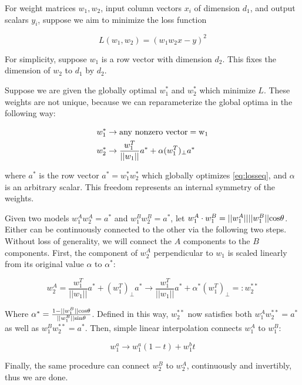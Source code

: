 \documentclass[twocolumn,superscriptaddress,aps,prb,floatfix]{revtex4-1}
\begin{document}
 For weight matrices $w_1, w_2$, input column vectors $x_i$ of dimension $d_1$, and output scalars $y_i$, suppose we aim to minimize the loss function
 
  \begin{equation}
 L(w_1,w_2)=(w_1 w_2 x - y)^2 \label{eq:losseq}
  \end{equation}
 
 For simplicity, suppose $w_1$ is a row vector with dimension $d_2$.  This fixes the dimension of $w_2$ to $d_1$ by $d_2$.
 
 Suppose we are given the globally optimal $w_1^*$ and $w_2^*$ which minimize $L$.  These weights are not unique, because we can reparameterize the global optima in the following way:
 
  \begin{align}
 w_1^* &\rightarrow \rm{any\ nonzero\ vector} = w_1 \\
 w_2^* &\rightarrow \frac{w_1^T}{||w_1||} a^* + \alpha (w_1^T)_\perp a^*
  \end{align}
  
  where $a^*$ is the row vector $a^*=w_1^* w_2^*$ which globally optimizes \eqref{eq:losseq}, and $\alpha$ is an arbitrary scalar.  This freedom represents an internal symmetry of the weights.
  
  Given two models $w_1^A w_2^A = a^*$ and $w_1^B w_2^B = a^*$, let $w_1^A \cdot w_1^B=||w_1^A||||w_1^B||\rm{cos}\theta$.  Either can be continuously connected to the other via the following two steps.  Without loss of generality, we will connect the $A$ components to the $B$ components.  First, the component of $w_2^A$ perpendicular to $w_1$ is scaled linearly from its original value $\alpha$ to $\alpha^*$:
  
 \begin{equation}
 w_2^A = \frac{w_1^T}{||w_1||} a^* + (w_1^T)_\perp a^* \rightarrow \frac{w_1^T}{||w_1||} a^* + \alpha^* (w_1^T)_\perp =: w_2^{**}
  \end{equation}
  
 Where $\alpha^*=\frac{1-||w_1^B||\rm{cos}\theta}{||w_1^B|| \rm{sin}\theta}$.  Defined in this way, $w_2^{**}$ now satisfies both $w_1^A w_2^{**} = a^*$ as well as $w_1^B w_2^{**} = a^*$.  Then, simple linear interpolation connects $w_1^A$ to $w_1^B$:
 
  \begin{equation}
 w_1^a \rightarrow w_1^a (1-t) + w_1^b t
  \end{equation}
  
  Finally, the same procedure can connect $w_2^B$ to $w_2^A$, continuously and invertibly, thus we are done.
  
\end{document}
